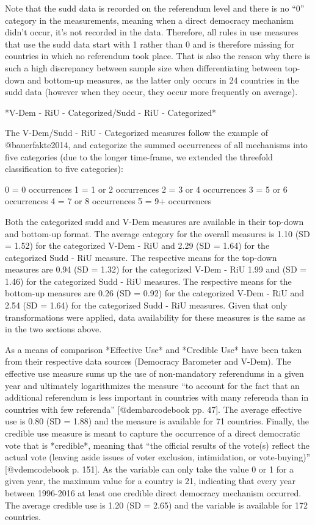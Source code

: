 \documentclass{systats}
\begin{document}
Note that the sudd data is recorded on the referendum level and there is no “0” category in the measurements, meaning when a direct democracy mechanism didn’t occur, it’s not recorded in the data. Therefore, all rules in use measures that use the sudd data start with 1 rather than 0 and is therefore missing for countries in which no referendum took place. That is also the reason why there is such a high discrepancy between sample size when differentiating between top-down and bottom-up measures, as the latter only occurs in 24 countries in the sudd data (however when they occur, they occur more frequently on average).

*V-Dem - RiU - Categorized/Sudd - RiU - Categorized*

The V-Dem/Sudd - RiU - Categorized measures follow the example of @bauerfakte2014, and categorize the summed occurrences of all mechanisms into five categories (due to the longer time-frame, we extended the threefold classification to five categories):

0 = 0 occurrences
1 = 1 or 2 occurrences
2 = 3 or 4 occurrences
3 = 5 or 6 occurrences
4 = 7 or 8 occurrences
5 = 9+ occurrences

Both the categorized sudd and V-Dem measures are available in their top-down and bottom-up format. The average category for the overall measures is 1.10 (SD = 1.52) for the categorized  V-Dem - RiU and 2.29 (SD = 1.64) for the categorized Sudd - RiU measure. The respective means for the top-down measures are 0.94 (SD = 1.32) for the categorized V-Dem - RiU 1.99 and (SD = 1.46) for the categorized Sudd - RiU measures.  The respective means for the bottom-up measures are 0.26 (SD = 0.92) for the categorized V-Dem - RiU and 2.54 (SD = 1.64) for the categorized Sudd - RiU measures.   Given that only transformations were applied, data availability for these measures is the same as in the two sections above.

As a means of comparison *Effective Use* and  *Credible Use* have been taken from their respective data sources (Democracy Barometer and V-Dem). The effective use measure sums up the use of non-mandatory referendums in a given year and ultimately logarithmizes the measure “to account for the fact that an additional referendum is less important in countries with many referenda than in countries with few referenda” [@dembarcodebook pp. 47]. The average effective use is 0.80 (SD = 1.88) and the measure is available for 71 countries. Finally, the credible use measure is meant to capture the occurrence of a direct democratic vote that is *credible*, meaning that “the official results of the vote(s) reflect the actual vote (leaving aside issues of voter exclusion, intimidation, or vote-buying)” [@vdemcodebook p. 151]. As the variable can only take the value 0 or 1 for a given year, the maximum value for a country is 21, indicating that every year between 1996-2016 at least one credible direct democracy mechanism occurred. The average credible use is 1.20 (SD = 2.65) and the variable is available for 172 countries.  
\end{document}
